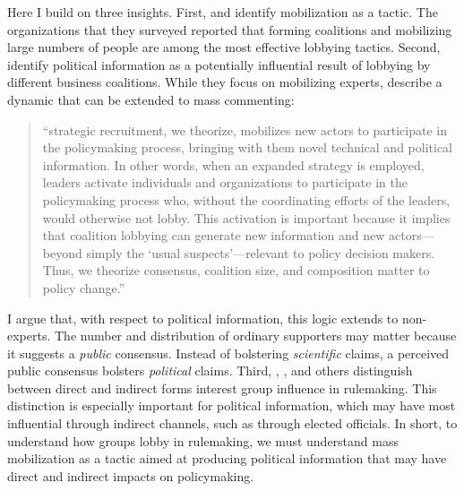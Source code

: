 Here I build on three insights. First, \citet{Furlong1997} and  \citet{Kerwin2011} identify mobilization as a tactic. The organizations that they surveyed reported that forming coalitions and mobilizing large numbers of people are among the most effective lobbying tactics. Second, \citet{Nelson2012} identify political information as a potentially influential result of lobbying by different business coalitions. While they focus on mobilizing experts, \citet{Nelson2012} describe a dynamic that can be extended to mass commenting: 
\begin{quote}
``strategic recruitment, we theorize, mobilizes new actors to participate in the policymaking process, bringing with them novel technical and political information. In other words, when an expanded strategy is employed, leaders activate individuals and organizations to participate in the policymaking process who, without the coordinating efforts of the leaders, would otherwise not lobby. This activation is important because it implies that coalition lobbying can generate new information and new actors---beyond simply the `usual suspects'---relevant to policy decision makers. Thus, we theorize consensus, coalition size, and composition matter to policy change.'' 
\end{quote}
I argue that, with respect to political information, this logic extends to non-experts. The number and distribution of ordinary supporters may matter because it suggests a \textit{public} consensus. Instead of bolstering \textit{scientific} claims, a perceived public consensus bolsters \textit{political} claims. Third, \citet{Furlong1998}, \citet{Yackee2006JPART}, and others distinguish between direct and indirect forms interest group influence in rulemaking. This distinction is especially important for political information, which may have most influential through indirect channels, such as through elected officials. In short, to understand how groups lobby in rulemaking, we must understand mass mobilization as a tactic aimed at producing political information that may have direct and indirect impacts on policymaking.%


